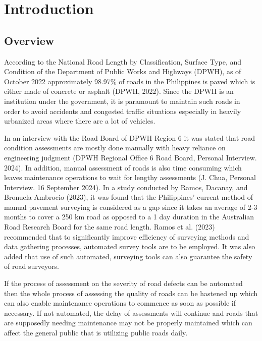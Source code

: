 \chapter{Introduction}
\label{sec:researchdesc}    %

\section{Overview}
\label{sec:overview}

According to the National Road Length by Classification, Surface Type, and Condition of the Department of Public Works and Highways (DPWH), as of October 2022 approximately 98.97\% of roads in the Philippines is paved which is either made of concrete or asphalt (DPWH, 2022). Since the DPWH is an institution under the government, it is paramount to maintain such roads in order to avoid accidents and congested traffic situations especially in heavily urbanized areas where there are a lot of vehicles.

In an interview with the Road Board of DPWH Region 6 it was stated that road condition assessments are mostly done manually with heavy reliance on engineering judgment (DPWH Regional Office 6 Road Board, Personal Interview. 2024). In addition, manual assessment of roads is also time consuming which leaves maintenance operations to wait for lengthy assessments (J. Chua, Personal Interview. 16 September 2024).  In a study conducted by Ramos, Dacanay, and Bronuela-Ambrocio (2023), it was found that the Philippines’ current method of manual pavement surveying is considered as a gap since it takes an average of 2-3 months to cover a 250 km road as opposed to a 1 day duration in the Australian Road Research Board for the same road length. Ramos et al. (2023) recommended that to significantly improve efficiency of surveying methods and data gathering processes, automated survey tools are to be employed. It was also added that use of such automated, surveying tools can also guarantee the safety of road surveyors.

If the process of assessment on the severity of road defects can be automated then the whole process of assessing the quality of roads can be hastened up which can also enable maintenance operations to commence as soon as possible if necessary. If not automated, the delay of assessments will continue and roads that are supposedly needing maintenance may not be properly maintained which can affect the general public that is utilizing public roads daily.

